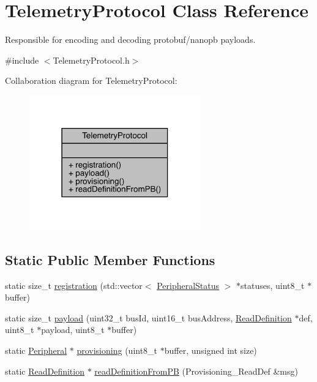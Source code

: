 \hypertarget{class_telemetry_protocol}{}\section{Telemetry\+Protocol Class Reference}
\label{class_telemetry_protocol}


Responsible for encoding and decoding protobuf/nanopb payloads.  




{\ttfamily \#include $<$Telemetry\+Protocol.\+h$>$}



Collaboration diagram for Telemetry\+Protocol\+:\nopagebreak
\begin{figure}[H]
\begin{center}
\leavevmode
\includegraphics[width=210pt]{class_telemetry_protocol__coll__graph}
\end{center}
\end{figure}
\subsection*{Static Public Member Functions}
\begin{DoxyCompactItemize}
\item 
static size\+\_\+t \mbox{\hyperlink{class_telemetry_protocol_ad8584639767a19015907168116f21c4b}{registration}} (std\+::vector$<$ \mbox{\hyperlink{struct_peripheral_status}{Peripheral\+Status}} $>$ $\ast$statuses, uint8\+\_\+t $\ast$buffer)
\item 
static size\+\_\+t \mbox{\hyperlink{class_telemetry_protocol_a9b14fc6a3f0942bdc9d91e45604c082a}{payload}} (uint32\+\_\+t bus\+Id, uint16\+\_\+t bus\+Address, \mbox{\hyperlink{struct_read_definition}{Read\+Definition}} $\ast$def, uint8\+\_\+t $\ast$payload, uint8\+\_\+t $\ast$buffer)
\item 
static \mbox{\hyperlink{struct_peripheral}{Peripheral}} $\ast$ \mbox{\hyperlink{class_telemetry_protocol_a2425d455bed0b9b994c1de41b334fca5}{provisioning}} (uint8\+\_\+t $\ast$buffer, unsigned int size)
\item 
static \mbox{\hyperlink{struct_read_definition}{Read\+Definition}} $\ast$ \mbox{\hyperlink{class_telemetry_protocol_a90e74801cf6d35be65276720839165ab}{read\+Definition\+From\+PB}} (Provisioning\+\_\+\+Read\+Def \&msg)
\end{DoxyCompactItemize}


